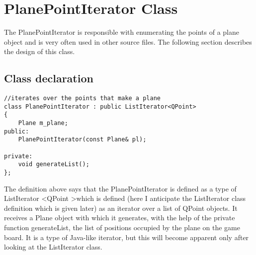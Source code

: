 \section{PlanePointIterator Class}

The PlanePointIterator is responsible with enumerating the points of a plane object and is very often used in other source files. The following section describes the design of this class.

\subsection {Class declaration}

\begin{lstlisting}
//iterates over the points that make a plane
class PlanePointIterator : public ListIterator<QPoint>
{
    Plane m_plane;
public:
    PlanePointIterator(const Plane& pl);

private:
    void generateList();
};
\end{lstlisting}

The definition above says that the PlanePointIterator is defined as a type of ListIterator \textless QPoint \textgreater which is defined (here I anticipate the ListIterator class definition which is given later) as an iterator over a list of QPoint objects. It receives a Plane object with which it generates, with the help of the private function generateList, the list of positions occupied by the plane on the game board. It is a type of Java-like iterator, but this will become apparent only after looking at the ListIterator class. 

